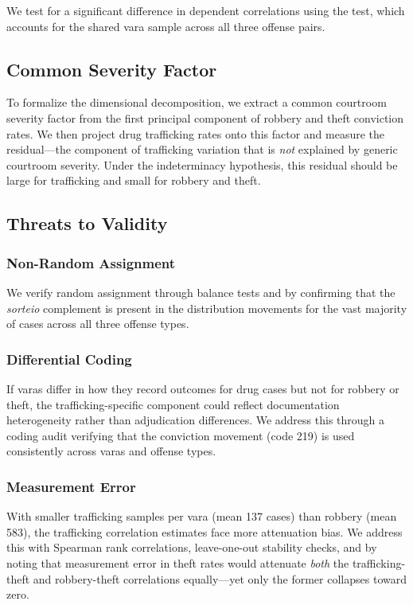 \documentclass[12pt]{article}
\begin{document}
We test for a significant difference in dependent correlations using the \citet{steiger1980} test, which accounts for the shared vara sample across all three offense pairs.

\subsection{Common Severity Factor}

To formalize the dimensional decomposition, we extract a common courtroom severity factor from the first principal component of robbery and theft conviction rates. We then project drug trafficking rates onto this factor and measure the residual---the component of trafficking variation that is \textit{not} explained by generic courtroom severity. Under the indeterminacy hypothesis, this residual should be large for trafficking and small for robbery and theft.

\subsection{Threats to Validity}

\subsubsection*{Non-Random Assignment} We verify random assignment through balance tests and by confirming that the \textit{sorteio} complement is present in the distribution movements for the vast majority of cases across all three offense types.

\subsubsection*{Differential Coding} If varas differ in how they record outcomes for drug cases but not for robbery or theft, the trafficking-specific component could reflect documentation heterogeneity rather than adjudication differences. We address this through a coding audit verifying that the conviction movement (code 219) is used consistently across varas and offense types.

\subsubsection*{Measurement Error} With smaller trafficking samples per vara (mean 137 cases) than robbery (mean 583), the trafficking correlation estimates face more attenuation bias. We address this with Spearman rank correlations, leave-one-out stability checks, and by noting that measurement error in theft rates would attenuate \textit{both} the trafficking-theft and robbery-theft correlations equally---yet only the former collapses toward zero.
\end{document}
